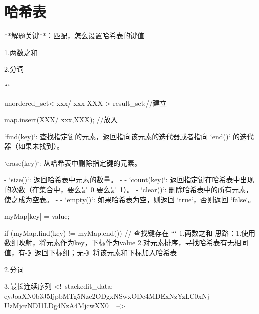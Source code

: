 \chapter{哈希表}

**解题关键**：匹配，怎么设置哈希表的键值


1.两数之和

2.分词

```

unordered_set< xxx/ xxx XXX > result_set;//建立

map.insert(XXX/ {xxx,XXX}); //放入

`find(key)`: 查找指定键的元素，返回指向该元素的迭代器或者指向 `end()` 的迭代器（如果未找到）。

`erase(key)`: 从哈希表中删除指定键的元素。

-   `size()`: 返回哈希表中元素的数量。
- -   `count(key)`: 返回指定键在哈希表中出现的次数（在集合中，要么是 0 要么是 1）。
-   `clear()`: 删除哈希表中的所有元素，使之成为空表。
- -   `empty()`: 如果哈希表为空，则返回 `true`，否则返回 `false`。

myMap[key] = value;

if (myMap.find(key) != myMap.end()) {
    // 查找键存在
}
```
1.两数之和
思路：1.使用数组映射，将元素作为key，下标作为value
2.对元素排序，寻找哈希表有无相同值，有-》返回下标组；无-》将该元素和下标加入哈希表

2.分词


3.最长连续序列
<!--stackedit_data:
eyJoaXN0b3J5IjpbMTg5Nzc2ODgxNSwxODc4MDExNzYzLC0xNj
UzMjczNDI1LDg4NzA4MjcwXX0=
-->